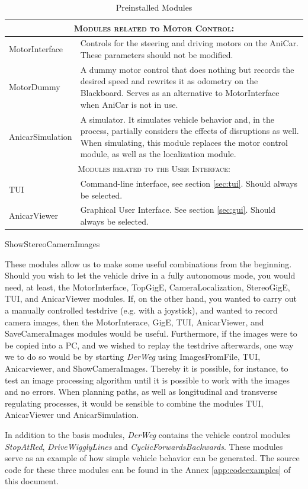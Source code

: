 \documentclass[a4paper, 11pt]{article}
\newcommand{\DerWeg}{\textit{DerWeg }} %
\begin{document}
\begin{table}
\begin{tabular}{p{}p{}}
\hline
\multicolumn{2}{|c|}{\textsc{Modules related to Motor Control:}} \\
\hline
MotorInterface & \raggedright Controls for the steering and driving motors on the AniCar. These parameters should not be modified. \tabularnewline
MotorDummy & \raggedright A dummy motor control that does nothing but records the desired speed and rewrites it as odometry on the Blackboard. Serves as an alternative to MotorInterface when AniCar is not in use. \tabularnewline
AnicarSimulation & \raggedright A simulator. It simulates vehicle behavior and, in the process, partially considers the effects of disruptions as well. When simulating, this module replaces the motor control module, as well as the localization module.  \tabularnewline
\hline
\multicolumn{2}{|c|}{\textsc{Modules related to the User Interface:}} \\
\hline
TUI & \raggedright Command-line interface, see section \ref{sec:tui}. Should always be selected. \tabularnewline
AnicarViewer & \raggedright Graphical User Interface. See section \ref{sec:gui}. Should always be selected. \tabularnewline
\hline
\end{tabular}
\caption{Preinstalled Modules}
\label{tab:modules}
\end{table} ShowStereoCameraImages

These modules allow us to make some useful combinations from the beginning. Should you wish to let the vehicle drive in a fully autonomous mode, you would need, at least, the MotorInterface, TopGigE, CameraLocalization, StereoGigE, TUI, and AnicarViewer modules. If, on the other hand, you wanted to carry out a manually controlled testdrive (e.g. with a joystick), and wanted to record camera images, then the MotorInterace, GigE, TUI, AnicarViewer, and SaveCameraImages modules would be useful. Furthermore, if the images were to be copied into a PC, and we wished to replay the testdrive afterwards, one way we to do so would be by starting \DerWeg using ImagesFromFile, TUI, Anicarviewer, and ShowCameraImages. Thereby it is possible, for instance, to test an image processing algorithm until it is possible to work with the images and no errors. When planning paths, as well as longitudinal and transverse regulating processes, it would be sensible to combine the modules TUI, AnicarViewer und AnicarSimulation.

In addition to the basis modules, \DerWeg contains the vehicle control modules \textit{StopAtRed}, %
\textit{DriveWigglyLines} and \textit{CyclicForwardsBackwards}. These modules serve as an example of how simple vehicle behavior can be generated. The source code for these three modules can be found in the Annex \ref{app:codeexamples} of this document. 
\end{document}
